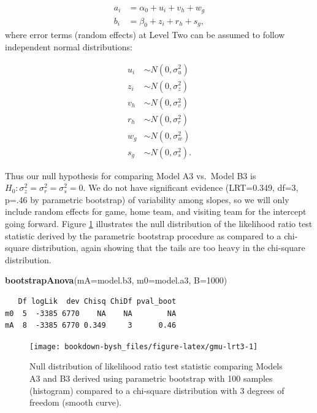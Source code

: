 \documentclass[
]{krantz}
\newenvironment{Shaded}{\begin{snugshade}}{\end{snugshade}}
\newcommand{\DataTypeTok}[1]{\textcolor[rgb]{0.27,0.27,0.27}{#1}}
\newcommand{\DecValTok}[1]{\textcolor[rgb]{0.06,0.06,0.06}{#1}}
\newcommand{\KeywordTok}[1]{\textcolor[rgb]{0.27,0.27,0.27}{\textbf{#1}}}
\newcommand{\NormalTok}[1]{#1}
\begin{document}
\begin{align*}
a_{i} & = \alpha_{0}+u_{i}+v_{h}+w_{g} \\
b_{i} & = \beta_{0}+z_{i}+r_{h}+s_{g},
\end{align*}
where error terms (random effects) at Level Two can be assumed to follow independent normal distributions:

\begin{align*}
u_{i} & \sim N \left( 0 , \sigma_{u}^{2} \right) \\
z_{i} & \sim N \left( 0 , \sigma_{z}^{2} \right) \\
v_{h} & \sim N \left( 0 , \sigma_{v}^{2} \right) \\
r_{h} & \sim N \left( 0 , \sigma_{r}^{2} \right) \\
w_{g} & \sim N \left( 0 , \sigma_{w}^{2} \right) \\
s_{g} & \sim N \left( 0 , \sigma_{s}^{2} \right).
\end{align*}

Thus our null hypothesis for comparing Model A3 vs.~Model B3 is \(H_{0}: \sigma_{z}^{2}=\sigma_{r}^{2}=\sigma_{s}^{2}=0\). We do not have significant evidence (LRT=0.349, df=3, p=.46 by parametric bootstrap) of variability among slopes, so we will only include random effects for game, home team, and visiting team for the intercept going forward. Figure \ref{fig:gmu-lrt3} illustrates the null distribution of the likelihood ratio test statistic derived by the parametric bootstrap procedure as compared to a chi-square distribution, again showing that the tails are too heavy in the chi-square distribution.

\begin{Shaded}
\begin{Highlighting}[]
\KeywordTok{bootstrapAnova}\NormalTok{(}\DataTypeTok{mA=}\NormalTok{model.b3, }\DataTypeTok{m0=}\NormalTok{model.a3, }\DataTypeTok{B=}\DecValTok{1000}\NormalTok{)}
\end{Highlighting}
\end{Shaded}

\begin{verbatim}
   Df logLik  dev Chisq ChiDf pval_boot
m0  5  -3385 6770    NA    NA        NA
mA  8  -3385 6770 0.349     3      0.46
\end{verbatim}

\begin{figure}

{\centering \texttt{[image: bookdown-bysh\_files/figure-latex/gmu-lrt3-1]} 

}

\caption{Null distribution of likelihood ratio test statistic comparing Models A3 and B3 derived using parametric bootstrap with 100 samples (histogram) compared to a chi-square distribution with 3 degrees of freedom (smooth curve).}\label{fig:gmu-lrt3}
\end{figure}
\end{document}
